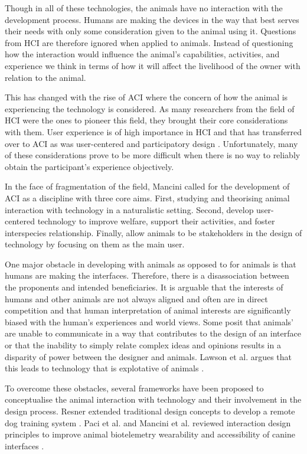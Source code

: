 \documentclass[conference]{IEEEtran}
\begin{document}
        Though in all of these technologies, the animals have no interaction with the development process. Humans are making the devices in the way that best serves their needs with only some consideration given to the animal using it. Questions from HCI are therefore ignored when applied to animals. Instead of questioning how the interaction would influence the animal’s capabilities, activities, and experience we think in terms of how it will affect the livelihood of the owner with relation to the animal.
        
        This has changed with the rise of ACI where the concern of how the animal is experiencing the technology is considered. As many researchers from the field of HCI were the ones to pioneer this field, they brought their core considerations with them. User experience is of high importance in HCI and that has transferred over to ACI as was user-centered and participatory design \cite{Forlizzi2004,10.1007/978-3-642-15231-3_11,Muller1993}. Unfortunately, many of these considerations prove to be more difficult when there is no way to reliably obtain the participant’s experience objectively.
        
        In the face of fragmentation of the field, Mancini called for the development of ACI as a discipline with three core aims. First, studying and theorising animal interaction with technology in a naturalistic setting. Second, develop user-centered technology to improve welfare, support their activities, and foster interspecies relationship. Finally, allow animals to be stakeholders in the design of technology by focusing on them as the main user.
        
        One major obstacle in developing with animals as opposed to for animals is that humans are making the interfaces. Therefore, there is a disassociation between the proponents and intended beneficiaries. It is arguable that the interests of humans and other animals are not always aligned and often are in direct competition and that human interpretation of animal interests are significantly biased with the human’s experiences and world views. Some posit that animals’ are unable to communicate in a way that contributes to the design of an interface or that the inability to simply relate complex ideas and opinions results in a disparity of power between the designer and animals. Lawson et al. argues that this leads to technology that is explotative of animals \cite{Lawson:2015:PUT:2702123.2702260}.
        
        To overcome these obstacles, several frameworks have been proposed to conceptualise the animal interaction with technology and their involvement in the design process. Resner extended traditional design concepts to develop a remote dog training system \cite{Resner2001}. Paci et al. and Mancini et al. reviewed interaction design principles to improve animal biotelemetry wearability and accessibility of canine interfaces \cite{Paci2016, Mancini:2011:AIM:1978822.1978836}.
\end{document}
